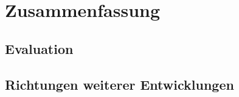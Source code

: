 \documentclass[12pt,a4paper,ngerman]{article}
\begin{document}
%
%


%



\section{Zusammenfassung}

\subsection{Evaluation}


\subsection{Richtungen weiterer Entwicklungen}


\newpage

\printbibliography

\newpage

\appendix


\newpage

\listoffigures
\end{document}
